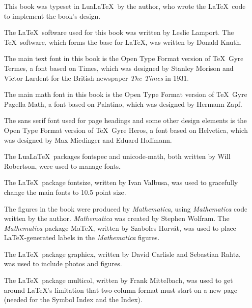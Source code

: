 \begin{Itemize}

\item
This book was typeset in Lua\LaTeX\ by the author, who wrote the \LaTeX\ code to implement the book's design.

\item
The \LaTeX\ software used for this book was written by Leslie Lamport. The \TeX\ software, which forms the base for \LaTeX, was written by Donald Knuth.

\item
The main text font in this book is the Open Type Format  version of \TeX\ Gyre Termes, a font based on Times,
which was designed by Stanley Morison and Victor Lardent for the British newspaper \emph{The Times} in 1931.

\item
The main math font in this book is the Open Type Format version of \TeX\ Gyre Pagella Math, a font based on Palatino, which was designed by Hermann Zapf.

\item
The sans serif font used for page headings and some other design elements is the Open Type Format version of \TeX\ Gyre Heros, a font based on Helvetica, which was designed by Max Miedinger and Eduard Hoffmann.

\item
The Lua\LaTeX\ packages \textsf{fontspec} and \textsf{unicode-math}, both written by Will Robertson, were used to manage fonts.

\item
The \LaTeX\ package \textsf{fontsize}, written by Ivan Valbusa, was used to gracefully change the main fonts to 10.5 point size.

\item
The figures in the book were produced by \textit{Mathematica}, using \textit{Mathematica} code written by the author. \textit{Mathematica} was created by Stephen Wolfram.
The \textit{Mathematica} package \textsf{MaTeX}, written by Szabolcs Horv\'at, was used to place \LaTeX-generated labels in the \textit{Mathematica} figures.

\item
The \LaTeX\ package \textsf{graphicx}, written by David Carlisle and Sebastian Rahtz, was used to include photos  and figures.

\item
The \LaTeX\ package \textsf{multicol}, written by Frank Mittelbach, was used to get around \LaTeX's limitation that two-column format must start on a new page (needed for the Symbol Index and the Index).


\end{Itemize}
